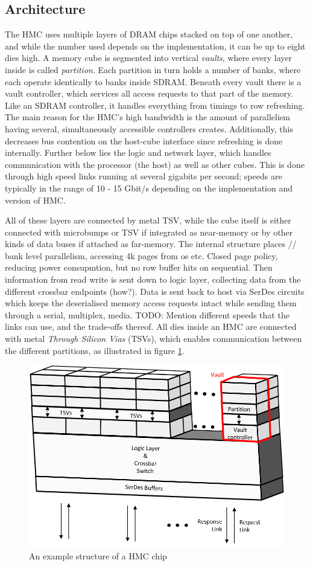 \subsection{Architecture}
The HMC uses multiple layers of DRAM chips stacked on top of one another, and while the number used depends on the implementation, it can be up to eight dies high. A memory cube is segmented into vertical \emph{vaults}, where every layer inside is called \emph{partition}. Each partition in turn holds a number of banks, where each operate identically to banks inside SDRAM. Beneath every vault there is a vault controller, which services all access requests to that part of the memory. Like an SDRAM controller, it handles everything from timings to row refreshing. The main reason for the HMC's high bandwidth is the amount of parallelism having several, simultaneously accessible controllers creates. Additionally, this decreases bus contention on the host-cube interface since refreshing is done internally. Further below lies the logic and network layer, which handles communication with the processor (the host) as well as other cubes. This is done through high speed links running at several gigabits per second; speeds are typically in the range of 10 - 15 Gbit/s depending on the implementation and version of HMC. 
\bigskip

All of these layers are connected by metal TSV, while the cube itself is either connected with microbumps or TSV if integrated as near-memory or by other kinds of data buses if attached as far-memory. The internal structure places // bank level parallelism, accessing 4k pages from os etc. Closed page policy, reducing power consupmtion, but no row buffer hits on sequential. Then information from read write is sent down to logic layer, collecting data from the different crossbar endpoints (how?). Data is sent back to host via SerDes circuits which keeps the deserialised memory access requests intact while sending them through a serial, multiplex, media. 
TODO: Mention different speeds that the links can use, and the trade-offs thereof. All dies inside an HMC are connected with metal \emph{Through Silicon Vias} (TSVs), which enables communication between the different partitions, as illustrated in figure \ref{HMC-structure}. 
\bigskip

\begin{figure}[h!]
\centering
\includegraphics[width=0.75\linewidth]{figure/HMC_structures.png}
\caption{An example structure of a HMC chip }
\label{HMC-structure}
\end{figure}

